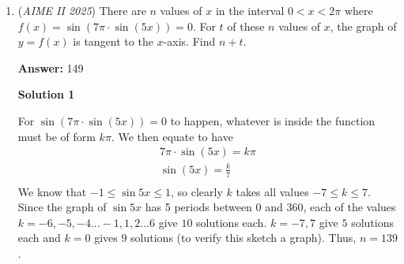 \begin{enumerate}
 Thus, the total number of unsuccessful numbers from $1$ to $1000$ inclusive is $390$, and the desired count of successful numbers is:

 
 \[1000 - 390 = \boxed{610}.\]

 (Feel free to make any edits on grammar, $\LaTeX$ and formatting.)

 \textbf{Proof of the Existence of the Cycle} For completeness, we'll present a proof that the cycle described in the first solution exists. 

 For a positive integer $n$ in the form $n=30+25m$ where $m$ is a non-negative integer, we claim that in the list of $25$ numbers below, 
 \[\underbrace{n,\ldots,n+4}_{\text{succeeds}},\underbrace{n+5,\ldots, n+9}_{\text{does not succeed}}, \underbrace{n+10,\ldots,n+14}_{\text{does not succeed}}, \underbrace{n+15, \ldots, n+24}_{\text{succeeds}}\] is the situation. We proceed by induction to show that this is true. 

 The base case of $n=30$ or equivalently $m=0$ is shown in Solution 1. Then, if the claim is true for $m=k$ for some non-negative integer $k$, then consider that for $m=k+1$ (i.e $n$ is increased by $25$), the greedy algorithm will first choose a $25$ cent coin for each of the $25$ numbers in the list, which reduces the problem to finding the numbers that succeeds for $m=k$. Hence, by induction, the claim is true.

 \href{https://mathproblemsolvingskills.wordpress.com/}{MathProblemSolvingSkills.com}

 


 


	\item (\textit{AIME II 2025}) There are $n$ values of $x$ in the interval $0<x<2\pi$ where $f(x)=\sin(7\pi\cdot\sin(5x))=0$. For $t$ of these $n$ values of $x$, the graph of $y=f(x)$ is tangent to the $x$-axis. Find $n+t$.


 
 \textbf{Answer: }149



\textbf{Solution 1}

For $\sin(7\pi\cdot\sin(5x))=0$ to happen, whatever is inside the function must be of form $k\pi$. We then equate to have\begin{align*}7\pi\cdot\sin(5x)=k\pi \\\sin(5x)=\frac{k}{7} \\\end{align*}
We know that $-1\le \sin{5x} \le 1$, so clearly $k$ takes all values $-7\le k \le 7$. Since the graph of $\sin{5x}$ has 5 periods between $0$ and $360$, each of the values $k=-6,-5,-4...-1,1,2...6$ give $10$ solutions each. $k=-7,7$ give $5$ solutions each and $k=0$ gives $9$ solutions (to verify this sketch a graph). Thus, $n=139$.


\end{enumerate}
